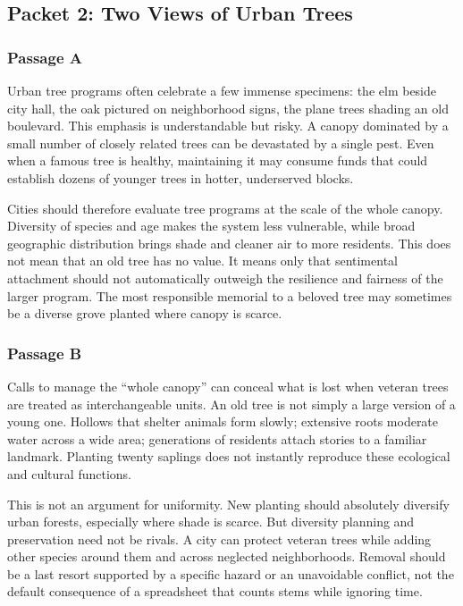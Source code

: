 \subsection*{Packet 2: Two Views of Urban Trees}

\subsubsection*{Passage A}

Urban tree programs often celebrate a few immense specimens: the elm beside city hall, the oak pictured on neighborhood signs, the plane trees shading an old boulevard. This emphasis is understandable but risky. A canopy dominated by a small number of closely related trees can be devastated by a single pest. Even when a famous tree is healthy, maintaining it may consume funds that could establish dozens of younger trees in hotter, underserved blocks.

Cities should therefore evaluate tree programs at the scale of the whole canopy. Diversity of species and age makes the system less vulnerable, while broad geographic distribution brings shade and cleaner air to more residents. This does not mean that an old tree has no value. It means only that sentimental attachment should not automatically outweigh the resilience and fairness of the larger program. The most responsible memorial to a beloved tree may sometimes be a diverse grove planted where canopy is scarce.

\subsubsection*{Passage B}

Calls to manage the ``whole canopy'' can conceal what is lost when veteran trees are treated as interchangeable units. An old tree is not simply a large version of a young one. Hollows that shelter animals form slowly; extensive roots moderate water across a wide area; generations of residents attach stories to a familiar landmark. Planting twenty saplings does not instantly reproduce these ecological and cultural functions.

This is not an argument for uniformity. New planting should absolutely diversify urban forests, especially where shade is scarce. But diversity planning and preservation need not be rivals. A city can protect veteran trees while adding other species around them and across neglected neighborhoods. Removal should be a last resort supported by a specific hazard or an unavoidable conflict, not the default consequence of a spreadsheet that counts stems while ignoring time.

